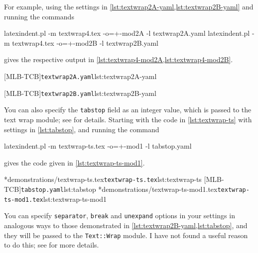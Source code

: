 	For example, using the settings in \cref{lst:textwrap2A-yaml,lst:textwrap2B-yaml} and
	running the commands
	\begin{commandshell}
latexindent.pl -m textwrap4.tex -o=+-mod2A -l textwrap2A.yaml
latexindent.pl -m textwrap4.tex -o=+-mod2B -l textwrap2B.yaml
\end{commandshell}
	gives the respective output in \cref{lst:textwrap4-mod2A,lst:textwrap4-mod2B}.

	\begin{cmhtcbraster}[raster column skip=.1\linewidth]
		[MLB-TCB]{\texttt{textwrap2A.yaml}}{lst:textwrap2A-yaml}

		[MLB-TCB]{\texttt{textwrap2B.yaml}}{lst:textwrap2B-yaml}
	\end{cmhtcbraster}

	You can also specify the \texttt{tabstop} field%
	 as an integer value, which is
	passed to the text wrap module; see \cite{textwrap} for details. Starting with the code
	in \cref{lst:textwrap-ts} with settings in \cref{lst:tabstop}, and running the command
	\begin{commandshell}
latexindent.pl -m textwrap-ts.tex -o=+-mod1 -l tabstop.yaml
\end{commandshell}
	gives the code given in \cref{lst:textwrap-ts-mod1}.
	\begin{cmhtcbraster}[raster columns=3,
			raster left skip=-3.5cm,
			raster right skip=-2cm,
			raster column skip=.03\linewidth]
		\cmhlistingsfromfile[showtabs=true]*{demonstrations/textwrap-ts.tex}{\texttt{textwrap-ts.tex}}{lst:textwrap-ts}
		[MLB-TCB]{\texttt{tabstop.yaml}}{lst:tabstop}
		\cmhlistingsfromfile[showtabs=true]*{demonstrations/textwrap-ts-mod1.tex}{\texttt{textwrap-ts-mod1.tex}}{lst:textwrap-ts-mod1}
	\end{cmhtcbraster}

	You can specify \texttt{separator}, \texttt{break} and \texttt{unexpand} options in your
	settings in analogous ways to those demonstrated in
	\cref{lst:textwrap2B-yaml,lst:tabstop}, and they will be passed to the
	\texttt{Text::Wrap} module. I have not found a useful reason to do this; see
	\cite{textwrap} for more details.

